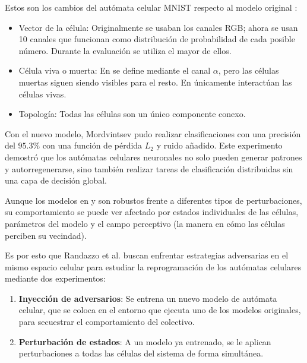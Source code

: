Estos son los cambios del autómata celular MNIST respecto al modelo original \cite{mordvintsevNCA}:

\begin{itemize}
	
	\item Vector de la célula: Originalmente se usaban los canales RGB; ahora se usan 10 canales que funcionan como distribución de probabilidad de cada posible número. Durante la evaluación se utiliza el mayor de ellos.
	
	\item Célula viva o muerta: En \cite{mordvintsevNCA} se define mediante el canal $\alpha$, pero las células muertas siguen siendo visibles para el resto. En \cite{MNIST}  únicamente interactúan las células vivas.
	
	\item Topología: Todas las células son un único componente conexo.
\end{itemize}

Con el nuevo modelo, Mordvintsev pudo realizar clasificaciones con una precisión del $95.3\%$ con una función de pérdida $L_2$ y ruido añadido. Este experimento demostró que los autómatas celulares neuronales no solo pueden generar patrones y autorregenerarse, sino también realizar tareas de clasificación distribuidas sin una capa de decisión global.

Aunque los modelos en \cite{mordvintsevNCA} y \cite{MNIST} son robustos frente a diferentes tipos de perturbaciones, su comportamiento se puede ver afectado por estados individuales de las células, parámetros del modelo y el campo perceptivo (la manera en cómo las células perciben su vecindad).

Es por esto que Randazzo et al. \cite{randazzoNCA} buscan enfrentar estrategias adversarias en el mismo espacio celular para estudiar la reprogramación de los autómatas celulares mediante dos experimentos:
\begin{enumerate}
	\item \textbf{Inyección de adversarios}: Se entrena un nuevo modelo de autómata celular, que se coloca en el entorno que ejecuta uno de los modelos originales, para secuestrar el comportamiento del colectivo.
	
	\item \textbf{Perturbación de estados}: A un modelo ya entrenado, se le aplican perturbaciones a todas las células del sistema de forma simultánea.
\end{enumerate}

